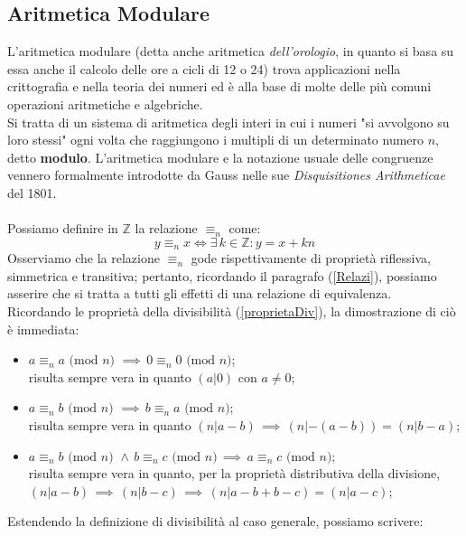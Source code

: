 \documentclass[a4paper,12pt]{article}
\begin{document}
\subsection{Aritmetica Modulare}
L'aritmetica modulare (detta anche aritmetica \emph{dell'orologio}, in quanto si basa su essa anche il calcolo delle ore a cicli di 12 o 24) trova applicazioni nella crittografia e nella teoria dei numeri ed è alla base di molte delle più comuni operazioni aritmetiche e algebriche.\\
Si tratta di un sistema di aritmetica degli interi in cui i numeri "si avvolgono su loro stessi" ogni volta che raggiungono i multipli di un determinato numero $n$, detto \textbf{modulo}. L'aritmetica modulare e la notazione usuale delle congruenze vennero formalmente introdotte da Gauss nelle sue \emph{Disquisitiones Arithmeticae} del 1801.\\\\
Possiamo definire in $\mathbb{Z}$ la relazione $\equiv_n$ come:
\begin{equation} \label{definizioneModulo}
    y \equiv_{n} x \Longleftrightarrow \exists \, k \in \mathbb{Z} : y = x + k n
\end{equation}
Osserviamo che la relazione $\equiv_n$ gode rispettivamente di proprietà riflessiva, simmetrica e transitiva; pertanto, ricordando il paragrafo (\ref{Relazi}), possiamo asserire che si tratta a tutti gli effetti di una relazione di equivalenza.\\
Ricordando le proprietà della divisibilità (\ref{proprietaDiv}), la dimostrazione di ciò è immediata:
\begin{itemize}
    \item $a \equiv_n a \text{ (mod $n$) } \implies \, 0 \equiv_n 0 \text{ (mod $n$)} $;\\
    risulta sempre vera in quanto $(a|0)$ con $a \neq 0$;
    \item $a \equiv_n b \text{ (mod $n$) } \implies \, b \equiv_n a \text{ (mod $n$)} $;\\
    risulta sempre vera in quanto $(n|a-b)\, \implies \, (n|-(a-b)) = (n|b-a)$;
    \item $a \equiv_n b \text{ (mod $n$) } \land \, b \equiv_n c \text{ (mod $n$)}\, \implies \, a \equiv_n c \text{ (mod $n$)}$;\\
    risulta sempre vera in quanto, per la proprietà distributiva della divisione,  $(n|a-b)\, \implies \, (n|b-c) \, \implies \, (n|a-b+b-c) = (n|a-c)$;
\end{itemize}
Estendendo la definizione di divisibilità al caso generale, possiamo scrivere:
\end{document}
